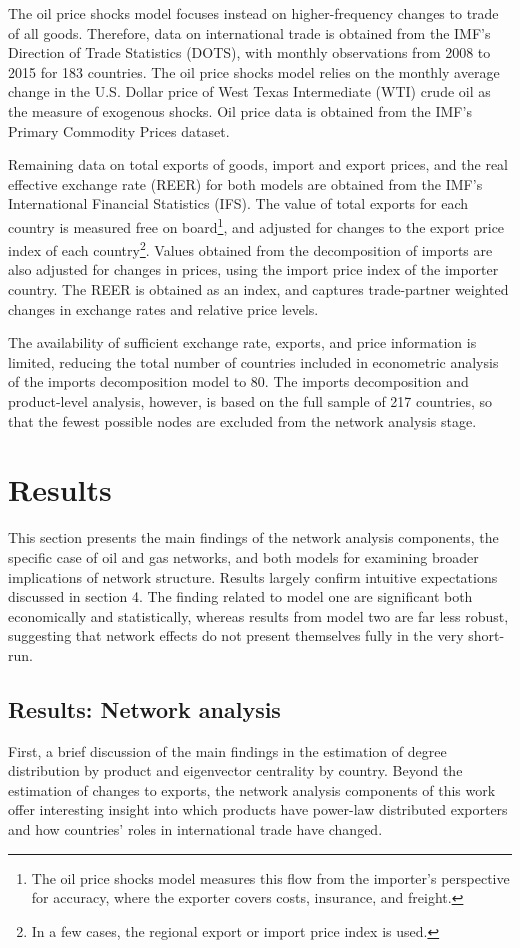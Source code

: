 \documentclass[10pt,letterpaper]{article}
\begin{document}
The oil price shocks model focuses instead on higher-frequency changes to trade of all goods. Therefore, data on international trade is obtained from the IMF's Direction of Trade Statistics (DOTS), with monthly observations from 2008 to 2015 for 183 countries. The oil price shocks model relies on the monthly average change in the U.S. Dollar price of West Texas Intermediate (WTI) crude oil as the measure of exogenous shocks. Oil price data is obtained from the IMF's Primary Commodity Prices dataset. 

Remaining data on total exports of goods, import and export prices, and the real effective exchange rate (REER) for both models are obtained from the IMF's International Financial Statistics (IFS). The value of total exports for each country is measured free on board\footnote{The oil price shocks model measures this flow from the importer's perspective for accuracy, where the exporter covers costs, insurance, and freight.}, and adjusted for changes to the export price index of each country\footnote{In a few cases, the regional export or import price index is used.}. Values obtained from the decomposition of imports are also adjusted for changes in prices, using the import price index of the importer country. The REER is obtained as an index, and captures trade-partner weighted changes in exchange rates and relative price levels. 

The availability of sufficient exchange rate, exports, and price information is limited, reducing the total number of countries included in econometric analysis of the imports decomposition model to 80. The imports decomposition and product-level analysis, however, is based on the full sample of 217 countries, so that the fewest possible nodes are excluded from the network analysis stage.

\section{Results} \label{results}
This section presents the main findings of the network analysis components, the specific case of oil and gas networks, and both models for examining broader implications of network structure. Results largely confirm intuitive expectations discussed in section 4. The finding related to model one are significant both economically and statistically, whereas results from model two are far less robust, suggesting that network effects do not present themselves fully in the very short-run.

\subsection{Results: Network analysis} \label{results_nw}
First, a brief discussion of the main findings in the estimation of degree distribution by product and eigenvector centrality by country. Beyond the estimation of changes to exports, the network analysis components of this work offer interesting insight into which products have power-law distributed exporters and how countries' roles in international trade have changed.
\end{document}
